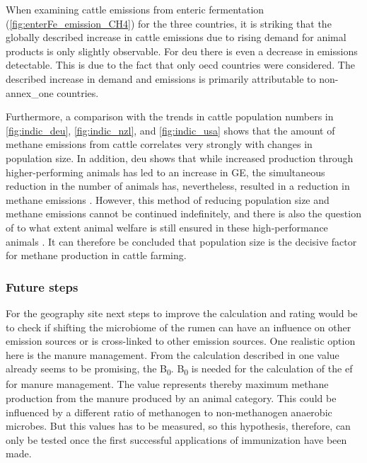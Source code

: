 When examining cattle emissions from enteric fermentation (\cref{fig:enterFe_emission_CH4}) for the three countries, it is striking that the globally described increase in cattle emissions due to rising demand for animal products \parencite{faoLivestockBalance2009, appelhansUnterschatztesTreibhausgasMethan2025} is only slightly observable. For \acrshort{deu} there is even a decrease in emissions detectable. This is due to the fact that only \acrshort{oecd} countries were considered. The described increase in demand and emissions is primarily attributable to non-\gls{annex_one} countries.

Furthermore, a comparison with the trends in cattle population numbers in \cref{fig:indic_deu}, \ref{fig:indic_nzl}, and \ref{fig:indic_usa} shows that the amount of methane emissions from cattle correlates very strongly with changes in population size. In addition, \acrshort{deu} shows that while increased production through higher-performing animals has led to an increase in \acrshort{GE}, the simultaneous reduction in the number of animals has, nevertheless, resulted in a reduction in methane emissions \parencite{Ger_Report_GHG, appelhansUnterschatztesTreibhausgasMethan2025}. However, this method of reducing population size and methane emissions cannot be continued indefinitely, and there is also the question of to what extent animal welfare is still ensured in these high-performance animals \parencite{appelhansUnterschatztesTreibhausgasMethan2025}. It can therefore be concluded that population size is the decisive factor for methane production in cattle farming.

\subsubsection{Future steps}
For the geography site next steps to improve the calculation and rating would be to check if shifting the microbiome of the rumen can have an influence on other emission sources or is cross-linked to other emission sources. One realistic option here is the manure management. From the calculation described in \textcite{ipccChapter10Emission2006} one value already seems to be  promising, the B\textsubscript{0}. B\textsubscript{0} is needed for the calculation of the \acrshort{ef} for manure management. The value represents thereby maximum methane production from the manure produced by an animal category. This could be influenced by a different ratio of methanogen to non-methanogen anaerobic microbes. But this values has to be measured, so this hypothesis, therefore, can only be tested once the first successful applications of immunization have been made.

